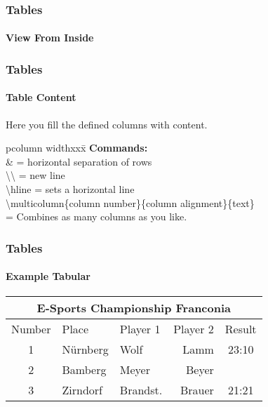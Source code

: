 \begin{frame}
\frametitle{Tables}
\framesubtitle{View From Inside}
\begin{ttfamily}

\end{ttfamily}
\end{frame}

\begin{frame}
\frametitle{Tables}
\framesubtitle{Table Content}
Here you fill the defined columns with content.\\[3mm]
\begin{tabbing}[H]p{column width}xxx\=\kill
\textbf{Commands:}\\
\color{nounibaredI}\&\color{black} \>= horizontal separation of rows\\
\color{nounibaredI}\textbackslash \textbackslash \color{black} \>=  new line\\
\color{nounibaredI}\textbackslash hline\color{black} \>= sets a horizontal line\\[2mm]
\color{nounibaredI}\textbackslash multicolumn\color{black}\{column number\}\{column alignment\}\{text\}\\[2mm]
\>= Combines as many columns as you like.\\
\end{tabbing}
\end{frame}

\begin{frame}[t]

\frametitle{Tables}
\framesubtitle{Example Tabular}
\begin{footnotesize}
\begin{ttfamily}

\end{ttfamily}
\end{footnotesize}

\begin{tabular}{c|p{40mm}|lr|c}
\multicolumn{5}{c}{E-Sports Championship Franconia}
 \\
\hline
\hline
Number & Place & Player 1 & Player 2 & Result \\
\hline
1 & N\"urnberg & Wolf & Lamm & 23:10 \\
\hline
2 & Bamberg & Meyer & Beyer & \\
\hline
3 & Zirndorf & Brandst. & Brauer & 21:21 \\
\hline
\end{tabular}
\end{frame}

